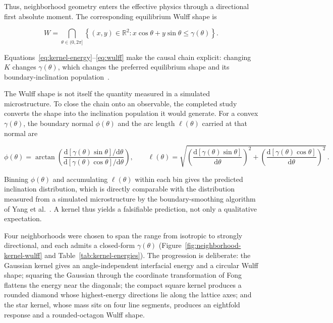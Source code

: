 \documentclass[proposalMode]{ufdissertation}
\begin{document}
Thus, neighborhood geometry enters the effective physics through a directional first absolute moment. The corresponding equilibrium Wulff shape is

\begin{equation}
W=
\bigcap_{\theta\in(0,2\pi]}
\left\{
(x,y)\in\mathbb{R}^2:
x\cos\theta+y\sin\theta\le\gamma(\theta)
\right\}.
\label{eq:wulff}
\end{equation}

Equations~\eqref{eq:kernel-energy}--\eqref{eq:wulff} make the causal chain explicit: changing \(K\) changes \(\gamma(\theta)\), which changes the preferred equilibrium shape and its boundary-inclination population~\cite{eggleston2001anisotropic,taylor1978crystalline}.

The Wulff shape is not itself the quantity measured in a simulated microstructure. To close the chain onto an observable, the completed study converts the shape into the inclination population it would generate. For a convex \(\gamma(\theta)\), the boundary normal \(\phi(\theta)\) and the arc length \(\ell(\theta)\) carried at that normal are

\begin{equation}
\phi(\theta)
=
\arctan\!
\left(
\frac{\mathrm{d}\left[\gamma(\theta)\sin\theta\right]/\mathrm{d}\theta}
{\mathrm{d}\left[\gamma(\theta)\cos\theta\right]/\mathrm{d}\theta}
\right),
\qquad
\ell(\theta)
=
\sqrt{
\left(\frac{\mathrm{d}\left[\gamma(\theta)\sin\theta\right]}{\mathrm{d}\theta}\right)^{2}
+
\left(\frac{\mathrm{d}\left[\gamma(\theta)\cos\theta\right]}{\mathrm{d}\theta}\right)^{2}
}\,.
\label{eq:inclination-from-wulff}
\end{equation}

Binning \(\phi(\theta)\) and accumulating \(\ell(\theta)\) within each bin gives the predicted inclination distribution, which is directly comparable with the distribution measured from a simulated microstructure by the boundary-smoothing algorithm of Yang et al.~\cite{yang2022inclination}. A kernel thus yields a falsifiable prediction, not only a qualitative expectation.

Four neighborhoods were chosen to span the range from isotropic to strongly directional, and each admits a closed-form \(\gamma(\theta)\) (Figure~\ref{fig:neighborhood-kernel-wulff} and Table~\ref{tab:kernel-energies}). The progression is deliberate: the Gaussian kernel gives an angle-independent interfacial energy and a circular Wulff shape; squaring the Gaussian through the coordinate transformation of Fong~\cite{fong2015squaring} flattens the energy near the diagonals; the compact square kernel produces a rounded diamond whose highest-energy directions lie along the lattice axes; and the star kernel, whose mass sits on four line segments, produces an eightfold response and a rounded-octagon Wulff shape.
\end{document}
